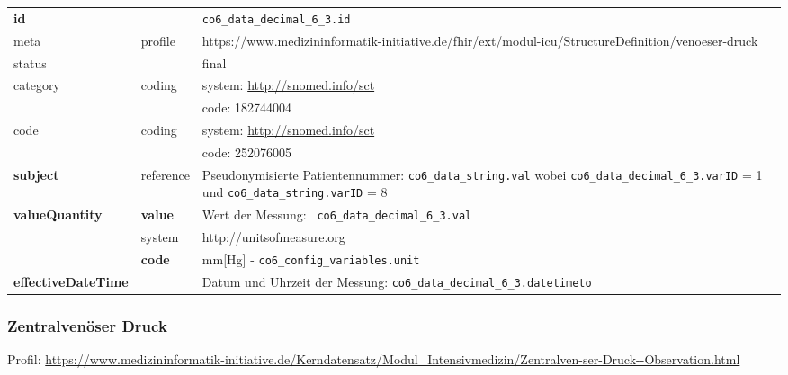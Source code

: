 \begin{longtable}{|l|l|p{7.5cm}|}
        \hline
        \rowcolor{lightgray} \multicolumn{3}{|l|}{Data Mapping (inhaltlich)} \\ \hline
        \textbf{id} &  & \texttt{co6\_data\_decimal\_6\_3.id} \\ \hline
	meta & profile & https://www.medizininformatik-initiative.de/fhir/ext/modul-icu/StructureDefinition/venoeser-druck \\ \hline 
	status &  & final   \\ \hline 
	category & coding & system: \url{http://snomed.info/sct} \\
\cline{3-3}
	& & code: 182744004 \\ \hline
	code & coding & system: \url{http://snomed.info/sct} \\ 
	\cline{3-3} 
	&  & code: 252076005 \\ \hline
	 	\textbf{subject} & reference & Pseudonymisierte Patientennummer: \texttt{co6\_data\_string.val} wobei \texttt{co6\_data\_decimal\_6\_3.varID} = 1 und \texttt{co6\_data\_string.varID} = 8 \\ \hline
	 \textbf{valueQuantity}  & \textbf{value} & Wert der Messung: \texttt{
co6\_data\_decimal\_6\_3.val} \\
        \cline{2-3}
         & system & http://unitsofmeasure.org \\
         \cline{2-3}
         & \textbf{code} & mm[Hg] - \texttt{co6\_config\_variables.unit} \\ \hline
     \textbf{effectiveDateTime}  & & Datum und Uhrzeit der Messung: \texttt{co6\_data\_decimal\_6\_3.datetimeto} \\ \hline
\end{longtable}

\subsubsection{Zentralvenöser Druck} 

Profil: \url{https://www.medizininformatik-initiative.de/Kerndatensatz/Modul_Intensivmedizin/Zentralven-ser-Druck--Observation.html}

\clearpage

